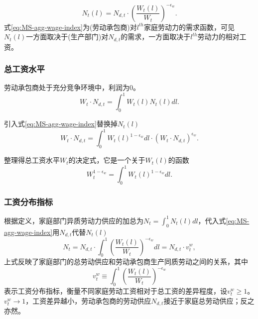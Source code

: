 \begin{equation}
\label{eq:MS-agg-wage-index}
N_t(l) = N_{d,t} \cdot \left(\frac{W_t(l)}{W_t}\right)^{-\epsilon_w}.
\end{equation}
式\eqref{eq:MS-agg-wage-index}为(劳动承包商)对$l^{th}$家庭劳动力的需求函数，可见$N_t(l)$一方面取决于(生产部门)对$N_{d,t}$的需求，一方面取决于$l^{th}$劳动力的相对工资。

\subsubsection{总工资水平}
劳动承包商处于充分竞争环境中，利润为0。
\begin{equation*}
W_t \cdot N_{d,t} = \int_{0}^{1} W_t(l) N_t(l) d l.
\end{equation*}

引入式\eqref{eq:MS-agg-wage-index}替换掉$N_t(l)$
\begin{equation*}
W_t \cdot N_{d,t} = \int_{0}^{1} W_t(l)^{1-\epsilon_w} d l \cdot \left(W_t \cdot N_{d,t} \right)^{\epsilon_w}.
\end{equation*}

整理得总工资水平$W_t$的决定式，它是一个关于$W_t(l)$的函数
\begin{equation}
\label{MS-agg-wage-index}
W_t^{1-\epsilon_w} = \int_0^1 W_t(l)^{1-\epsilon_w} dl.
\end{equation}

\subsubsection{工资分布指标}
根据定义，家庭部门异质劳动力供应的加总为$N_t = \int_0^1 N_t(l) dl$，代入式\eqref{eq:MS-agg-wage-index}用$N_{d,t}$代替$N_t(l)$
\begin{equation}
\label{eq:MS-Nt-Ndt}
N_t = N_{d,t} \cdot \int_0^1 \left(\frac{W_t(l)}{W_t}\right)^{-\epsilon_w} dl = N_{d,t} \cdot v^w_t,
\end{equation}
上式反映了家庭部门的总劳动供应和劳动承包商生产同质劳动之间的关系，其中
\begin{equation}
\label{eq:MS-wage-disper-index}
v^w_t \equiv \int_{0}^1 \left(\frac{W_t(l)}{W_t}\right)^{-\epsilon_w}
\end{equation}
表示工资分布指标，衡量不同家庭劳动工资相对于总工资的差异程度，设$v^w_t \ge 1$。$v^w_t \rightarrow 1$，工资差异越小，劳动承包商的劳动供应$N_{d,t}$接近于家庭总劳动供应；反之亦然。

